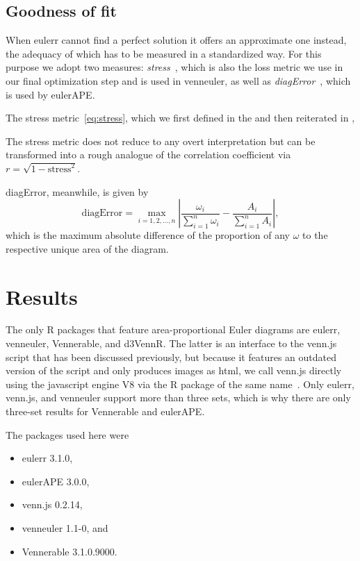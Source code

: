\documentclass[
  oneside,
  openany,
  numbers=noendperiod,
  parskip=half,
  bibliography=totoc
]{scrbook}\usepackage[]{graphicx}\usepackage{xcolor}
\newcommand{\proglang}[1]{\textsf{#1}}
\newcommand{\pkg}[1]{{\fontseries{b}\selectfont #1}}
\begin{document}
\section{Goodness of fit}
\label{sec:gof}

When \pkg{eulerr} cannot find a perfect solution it offers an approximate one
instead, the adequacy of which has to be measured in a standardized way. For
this purpose we adopt two measures: \emph{stress}~\citep{Wilkinson_2012}, which
is also the loss metric we use in our final optimization step and is
used in \pkg{venneuler}, as well as
\emph{diagError}~\citep{Micallef_2014a}, which is used by \pkg{eulerAPE}.

The stress metric~\eqref{eq:stress}, which we first defined in the
 and then reiterated in ,

The stress metric does not reduce to any overt interpretation but
can be transformed into a rough analogue of the correlation coefficient via
$r = \sqrt{1-\text{stress}^2}$.

diagError, meanwhile, is given by
\begin{equation}
\text{diagError} = \max_{i = 1, 2, \dots, n} \left|
  \frac{\omega_i}{\sum_{i=1}^n \omega_i} -\frac{A_i}{\sum_{i=1}^n A_i} \right|,
\label{eq:diagError}
\end{equation}
which is the maximum absolute difference of the proportion of any $\omega$ to
the respective unique area of the diagram.

\chapter{Results}
\label{ch:results}

The only R packages that feature area-proportional Euler diagrams are
\pkg{eulerr}, \pkg{venneuler}, \pkg{Vennerable}, and \pkg{d3VennR}. The latter
is an interface to the \pkg{venn.js} script that has been discussed previously,
but because it features an outdated version of the script and only produces
images as html, we call \pkg{venn.js} directly using the \proglang{javascript}
engine \pkg{V8} via the R package of the same name~\citep{Ooms_2017}.
Only \pkg{eulerr}, \pkg{venn.js}, and \pkg{venneuler} support more than three
sets, which is why there are only three-set results for \pkg{Vennerable} and
\pkg{eulerAPE}.

The packages used here were
\begin{itemize}
  \item \pkg{eulerr} 3.1.0,
  \item \pkg{eulerAPE} 3.0.0,
  \item \pkg{venn.js} 0.2.14,
  \item \pkg{venneuler} 1.1-0, and
  \item \pkg{Vennerable} 3.1.0.9000.
\end{itemize}
\end{document}
